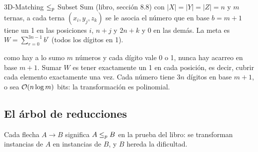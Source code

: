 \begin{problema}{3D-Matching $\le_{p}$ Subset Sum (libro, sección 8.8)}
 con $|X|=|Y|=|Z|=n$ y $m$ ternas, a cada terna $(x_i,y_j,z_k)$ se le asocia el número que en base $b=m+1$ tiene un 1 en las posiciones $i$, $n+j$ y $2n+k$ y 0 en las demás. La meta es $W=\sum_{r=0}^{3n-1}b^{r}$ (todos los dígitos en 1).

 como hay a lo sumo $m$ números y cada dígito vale 0 o 1, nunca hay acarreo en base $m+1$. Sumar $W$ es tener exactamente un 1 en cada posición, es decir, cubrir cada elemento exactamente una vez. Cada número tiene $3n$ dígitos en base $m+1$, o sea $\mathcal{O}(n\log m)$ bits: la transformación es polinomial.
\end{problema}

\subsection{El árbol de reducciones}

Cada flecha $A\to B$ significa $A\le_{p} B$ en la prueba del libro: se transforman instancias de $A$ en instancias de $B$, y $B$ hereda la dificultad.

